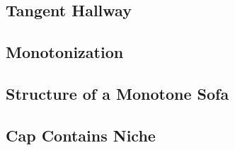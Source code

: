 
\subsection{Tangent Hallway}
\label{sec:tangent-hallway}


\subsection{Monotonization}
\label{sec:monotonization}


\subsection{Structure of a Monotone Sofa}
\label{sec:structure-of-a-monotone-sofa}


\subsection{Cap Contains Niche}
\label{sec:cap-contains-niche}


